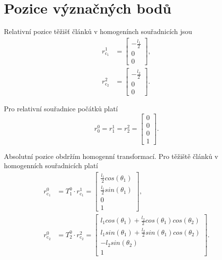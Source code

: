 \documentclass[twoside]{article}
\begin{document}
\section{Pozice význačných bodů}

Relativní pozice těžišť článků v homogenínch souřadnicích jsou
\begin{equation}
	\begin{split}
		r_{\text{c}_1}^1 &= \begin{bmatrix}
			-\frac{l_1}{2} \\ 0 \\ 0
		\end{bmatrix}, \\
		r_{\text{c}_2}^2 &= \begin{bmatrix}
			-\frac{l_2}{2} \\ 0 \\ 0
		\end{bmatrix}.
	\end{split}
\end{equation}

Pro relativní souřadnice počátků platí
\begin{equation}
	r_{0}^0 = r_{1}^1 = r_2^2 = \begin{bmatrix}
		0 \\ 0 \\ 0 \\ 1
	\end{bmatrix}.
\end{equation}

Absolutní pozice obdržím homogenní transformací. Pro těžiště článků v homogenních souřadnicích platí
\begin{equation}
	\begin{split}
		r_{\text{c}_1}^0 &= T_1^0 \cdot r_{\text{c}_1}^1 = \begin{bmatrix}
			\frac{l_1}{2} cos(\theta_1) \\ \frac{l_1}{2} sin(\theta_1) \\ 0 \\ 1
		\end{bmatrix}, \\
		r_{\text{c}_2}^0 &= T_2^0 \cdot r_{\text{c}_2}^2 = \begin{bmatrix}
			l_1 cos(\theta_1) + \frac{l_2}{2} cos(\theta_1) cos(\theta_2) \\
			l_1 sin(\theta_1) + \frac{l_2}{2} sin(\theta_1) cos(\theta_2) \\
			- l_2 sin(\theta_2) \\
			1
		\end{bmatrix}.
	\end{split}
\end{equation}
\end{document}
